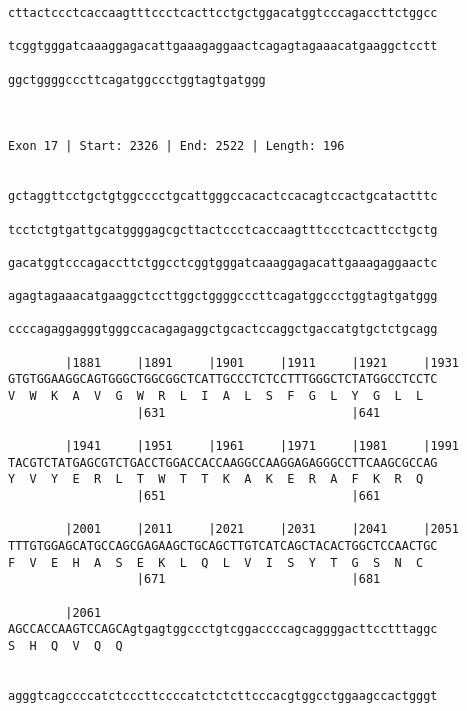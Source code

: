 \documentclass{article}
\begin{document}
\begin{Verbatim}
cttactccctcaccaagtttccctcacttcctgctggacatggtcccagaccttctggcc
                                                            
tcggtgggatcaaaggagacattgaaagaggaactcagagtagaaacatgaaggctcctt
                                                            
ggctggggcccttcagatggccctggtagtgatggg
                                    
                                    
 
Exon 17 | Start: 2326 | End: 2522 | Length: 196


gctaggttcctgctgtggcccctgcattgggccacactccacagtccactgcatactttc
                                                            
tcctctgtgattgcatggggagcgcttactccctcaccaagtttccctcacttcctgctg
                                                            
gacatggtcccagaccttctggcctcggtgggatcaaaggagacattgaaagaggaactc
                                                            
agagtagaaacatgaaggctccttggctggggcccttcagatggccctggtagtgatggg
                                                            
ccccagaggagggtgggccacagagaggctgcactccaggctgaccatgtgctctgcagg
                                                            
        |1881     |1891     |1901     |1911     |1921     |1931
GTGTGGAAGGCAGTGGGCTGGCGGCTCATTGCCCTCTCCTTTGGGCTCTATGGCCTCCTC
V  W  K  A  V  G  W  R  L  I  A  L  S  F  G  L  Y  G  L  L  
                  |631                          |641        
  
        |1941     |1951     |1961     |1971     |1981     |1991
TACGTCTATGAGCGTCTGACCTGGACCACCAAGGCCAAGGAGAGGGCCTTCAAGCGCCAG
Y  V  Y  E  R  L  T  W  T  T  K  A  K  E  R  A  F  K  R  Q  
                  |651                          |661        
  
        |2001     |2011     |2021     |2031     |2041     |2051
TTTGTGGAGCATGCCAGCGAGAAGCTGCAGCTTGTCATCAGCTACACTGGCTCCAACTGC
F  V  E  H  A  S  E  K  L  Q  L  V  I  S  Y  T  G  S  N  C  
                  |671                          |681        
  
        |2061                                               
AGCCACCAAGTCCAGCAgtgagtggccctgtcggaccccagcaggggacttcctttaggc
S  H  Q  V  Q  Q                                            
                                                            
  
agggtcagccccatctcccttccccatctctcttcccacgtggcctggaagccactgggt
                                                            

\end{Verbatim}
\end{document}
